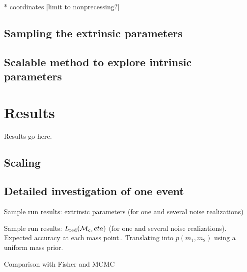\documentclass[twocolumn,prd,nofootinbib]{revtex4}
\newcommand\mc{{{\cal M}_c}}
\begin{document}
* coordinates [limit to nonprecessing?]

\subsection{Sampling the extrinsic parameters}

\subsection{Scalable method to explore intrinsic parameters }


\section{Results}

Results go here.

\subsection{Scaling}

\subsection{Detailed investigation of one event}

Sample run results: extrinsic parameters (for one and several noise realizations)

Sample run results: $L_{\rm red}(\mc,eta)$ (for one and several noise realizations). Expected accuracy at each mass
point.. Translating into  $p(m_1,m_2)$ using a uniform mass prior.

Comparison with Fisher and MCMC
\end{document}
